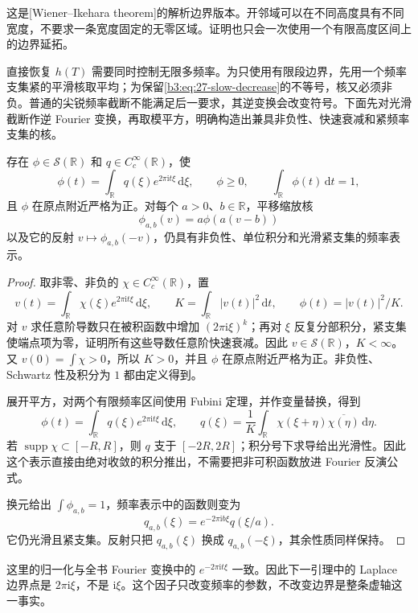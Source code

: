 这是[Wiener--Ikehara theorem]的解析边界版本。开邻域可以在不同高度具有不同宽度，不要求一条宽度固定的无零区域。证明也只会一次使用一个有限高度区间上的边界延拓。

\ProseParagraphBreak

直接恢复 \(h(T)\) 需要同时控制无限多频率。为只使用有限段边界，先用一个频率支集紧的平滑核取平均；为保留\eqref{b3:eq:27-slow-decrease}的不等号，核又必须非负。普通的尖锐频率截断不能满足后一要求，其逆变换会改变符号。下面先对光滑截断作逆 Fourier 变换，再取模平方，明确构造出兼具非负性、快速衰减和紧频率支集的核。

\begin{lemma}[非负的紧频率核]
\label{b3:lem:27-positive-bandlimited-kernel}
存在 \(\phi\in\mathcal S(\mathbb R)\) 和 \(q\in C_c^\infty(\mathbb R)\)，使
\[
 \phi(t)=\int_{\mathbb R}q(\xi)e^{2\pi\mathrm it\xi}\,\mathrm d\xi,
 \qquad \phi\ge0,\qquad\int_{\mathbb R}\phi(t)\,\mathrm dt=1,
\]
且 \(\phi\) 在原点附近严格为正。对每个 \(a>0\)、\(b\in\mathbb R\)，平移缩放核
\[
 \phi_{a,b}(v)=a\phi(a(v-b))
\]
以及它的反射 \(v\mapsto\phi_{a,b}(-v)\)，仍具有非负性、单位积分和光滑紧支集的频率表示。
\end{lemma}
\begin{proof}
取非零、非负的 \(\chi\in C_c^\infty(\mathbb R)\)，置
\[
 v(t)=\int_{\mathbb R}\chi(\xi)e^{2\pi\mathrm it\xi}\,\mathrm d\xi,
 \qquad K=\int_{\mathbb R}|v(t)|^2\,\mathrm dt,
 \qquad\phi(t)=|v(t)|^2/K.
\]
对 \(v\) 求任意阶导数只在被积函数中增加 \((2\pi\mathrm i\xi)^k\)；再对 \(\xi\) 反复分部积分，紧支集使端点项为零，证明所有这些导数任意阶快速衰减。因此 \(v\in\mathcal S(\mathbb R)\)，\(K<\infty\)。又 \(v(0)=\int\chi>0\)，所以 \(K>0\)，并且 \(\phi\) 在原点附近严格为正。非负性、Schwartz 性及积分为 \(1\) 都由定义得到。

展开平方，对两个有限频率区间使用 Fubini 定理，并作变量替换，得到
\[
 \phi(t)=\int_{\mathbb R}q(\xi)e^{2\pi\mathrm it\xi}\,\mathrm d\xi,
 \qquad
 q(\xi)=\frac1K\int_{\mathbb R}
       \chi(\xi+\eta)\overline{\chi(\eta)}\,\mathrm d\eta.
\]
若 \(\operatorname{supp}\chi\subset[-R,R]\)，则 \(q\) 支于 \([-2R,2R]\)；积分号下求导给出光滑性。因此这个表示直接由绝对收敛的积分推出，不需要把非可积函数放进 Fourier 反演公式。

换元给出 \(\int\phi_{a,b}=1\)，频率表示中的函数则变为
\[
 q_{a,b}(\xi)=e^{-2\pi\mathrm ib\xi}q(\xi/a).
\]
它仍光滑且紧支集。反射只把 \(q_{a,b}(\xi)\) 换成 \(q_{a,b}(-\xi)\)，其余性质同样保持。
\end{proof}

这里的归一化与全书 Fourier 变换中的 \(e^{-2\pi\mathrm it\xi}\) 一致。因此下一引理中的 Laplace 边界点是 \(2\pi\mathrm i\xi\)，不是 \(\mathrm i\xi\)。这个因子只改变频率的参数，不改变边界是整条虚轴这一事实。

